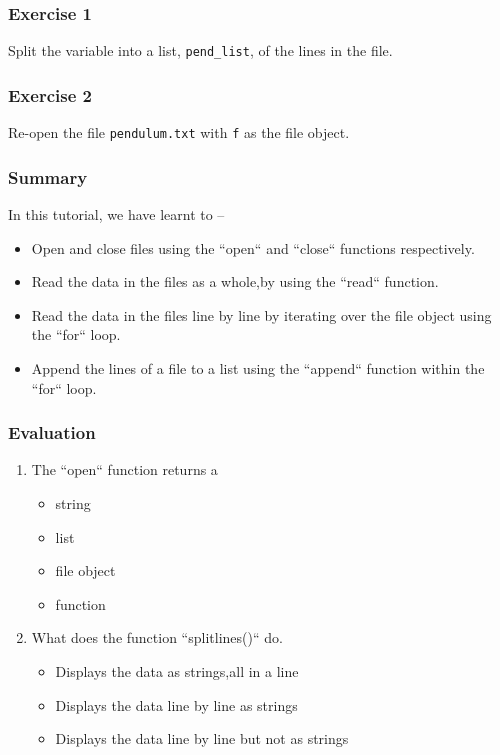 \documentclass[presentation]{beamer}
\begin{document}
\begin{frame}
\frametitle{Exercise 1}
\label{sec-4}

  Split the variable into a list, \texttt{pend\_list}, of the lines in the
  file.
\end{frame}
\begin{frame}
\frametitle{Exercise 2}
\label{sec-5}

  Re-open the file \texttt{pendulum.txt} with \texttt{f} as the file object.
\end{frame}
\begin{frame}
\frametitle{Summary}
\label{sec-6}

  In this tutorial, we have learnt to –

\begin{itemize}
\item Open and close files using the ``open`` and ``close`` functions respectively.
\item Read the data in the files as a whole,by using the ``read`` function.
\item Read the data in the files line by line by iterating over the file object
    using the ``for`` loop.
\item Append the lines of a file to a list using the ``append`` function within
    the  ``for`` loop.
\end{itemize}
\end{frame}
\begin{frame}
\frametitle{Evaluation}
\label{sec-7}


\begin{enumerate}
\item The ``open`` function returns a
\begin{itemize}
\item string
\item list
\item file object
\item function
\end{itemize}
\vspace{8pt}
\item What does the function ``splitlines()`` do.
\begin{itemize}
\item Displays the data as strings,all in a line
\item Displays the data line by line as strings
\item Displays the data line by line but not as strings
\end{itemize}
\end{enumerate}
\end{frame}
\end{document}
